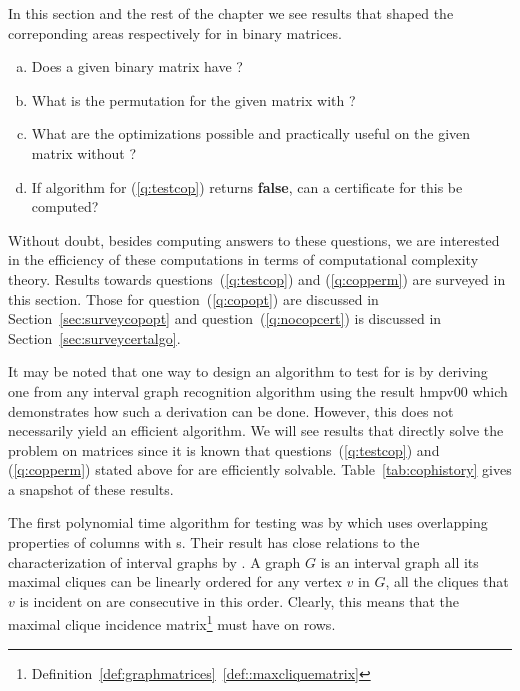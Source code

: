 In this section and the rest of the chapter we see results that shaped the
correponding areas respectively for \cop in binary matrices.

\begin{enumerate}[a.]
\singlespacing
\item \label{q:testcop} Does a given binary matrix have \COP?
\item \label{q:copperm} What is the \COP permutation for the given matrix with \COP?
\item \label{q:copopt} What are the optimizations possible and practically useful on
  the given matrix without \COP?
\item \label{q:nocopcert} If algorithm for (\ref{q:testcop}) returns
  \textbf{false}, can a certificate for this be computed?
\end{enumerate}

Without doubt, besides computing answers to these questions, we are
interested in the efficiency of these computations in terms of
computational complexity theory. Results towards
questions~(\ref{q:testcop}) and (\ref{q:copperm}) are surveyed in this
section. Those for question~(\ref{q:copopt}) are discussed in
Section~\ref{sec:surveycopopt} and question~(\ref{q:nocopcert}) is discussed
in Section~\ref{sec:surveycertalgo}.

It may be noted that one way to design an algorithm to test for \COP
is by deriving one from any interval graph recognition algorithm using
the result {\sc hmpv00}  \cite{d08phd} which demonstrates how such a
derivation can be done. However, this does not necessarily yield an
efficient algorithm. We will see results that directly solve the
problem on matrices since it is known that questions~(\ref{q:testcop})
and (\ref{q:copperm}) stated above for \COP are efficiently solvable.
Table~\ref{tab:cophistory} gives a snapshot of these results.

\tabcophistory

The first polynomial time algorithm for \COP testing was by
\cite{fg65} which uses overlapping properties of columns with \un
s. Their result has close relations to the characterization of
interval graphs by \cite{gh64}. A graph $G$ is an interval graph \iff
all its maximal cliques can be linearly ordered \stt for any vertex
$v$ in $G$, all the cliques that $v$ is incident on are consecutive in
this order. Clearly, this means that the maximal clique incidence
matrix\footnote{
  Definition~\ref{def:graphmatrices}~\ref{def::maxcliquematrix}} must
have \COP on rows.

